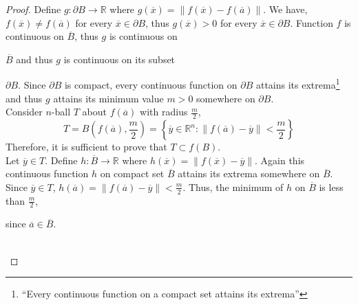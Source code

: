 \begin{proof}
	Define $g : \partial B \to \mathbb{R}$ where $g(\overline{x}) = \| f(\overline{x}) - f(\overline{a}) \| $. We have, $f(\overline{x}) \ne f(\overline{a})$ for every $\overline{x} \in \partial B$, thus $g(\overline{x}) > 0$ for every $\overline{x} \in \partial B$. Function $f$ is continuous on $\overline{B}$, thus $g$ is continuous on \begin{commentary}$\overline{B}$ and thus $g$ is continuous on its subset\end{commentary} $\partial B$. Since $\partial B$ is compact, every continuous function on $\partial B$ attains its extrema\footnote{``Every continuous function on a compact set attains its extrema''} and thus $g$ attains its minimum value $m > 0$ somewhere on $\partial B$.\\

	Consider $n$-ball $T$ about $f(\overline{a})$ with radius $\frac{m}{2}$, 
	\[ T = B\left(f(\overline{a}),\frac{m}{2}\right) = \left\{ \overline{y} \in \mathbb{R}^n : \| f(\overline{a}) - \overline{y}\| < \frac{m}{2} \right\} \]
	Therefore, it is sufficient to prove that $T \subset f(B)$.\\

	Let $\overline{y} \in T$. Define $h : \overline{B} \to \mathbb{R}$ where $h(\overline{x}) = \| f(\overline{x}) - \overline{y} \|$. Again this continuous function $h$ on compact set $\overline{B}$ attains its extrema somewhere on $\overline{B}$. Since $\overline{y} \in T$, $h(\overline{a}) = \| f(\overline{a}) - \overline{y} \| < \frac{m}{2} $. Thus, the minimum of $h$ on $\overline{B}$ is less than $\frac{m}{2}$, \begin{commentary}since $\overline{a} \in \overline{B}$.\end{commentary}\\


\end{proof}
